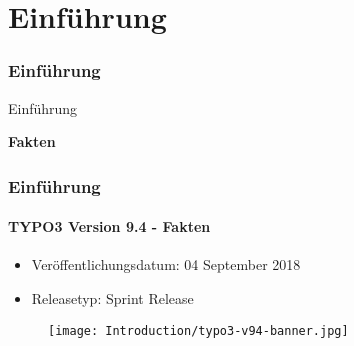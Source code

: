 %


\section{Einführung}
\begin{frame}[fragile]
	\frametitle{Einführung}

	\begin{center}\huge{Einführung}\end{center}
	\begin{center}\huge{\color{typo3darkgrey}\textbf{Fakten}}\end{center}

\end{frame}


\begin{frame}[fragile]
	\frametitle{Einführung}
	\framesubtitle{TYPO3 Version 9.4 - Fakten}

	\begin{itemize}
		\item Veröffentlichungsdatum: 04 September 2018
		\item Releasetyp: Sprint Release
	\end{itemize}

	\begin{figure}
		\texttt{[image: Introduction/typo3-v94-banner.jpg]}
	\end{figure}

\end{frame}


